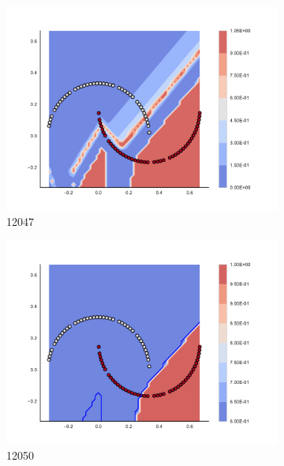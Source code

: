 \begin{figure}[h]
\begin{subfigure}[b]{0.09\textwidth}
    \includegraphics[clip, trim=2.35cm 1.75cm 4.5cm 0cm,width=\textwidth]{img/convergence/12047.pdf}
    \caption{12047}
    \label{fig:convergence_12047}
\end{subfigure}
%
\begin{subfigure}[b]{0.09\textwidth}
    \includegraphics[clip, trim=2.35cm 1.75cm 4.5cm 0cm,width=\textwidth]{img/convergence/12050.pdf}
    \caption{12050}
    \label{fig:convergence_12050}
\end{subfigure}
%
\begin{subfigure}[b]{0.09\textwidth}

\end{subfigure}
\end{figure}
